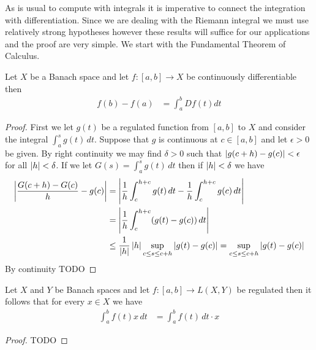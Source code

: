 As is usual to compute with integrals it is imperative to connect the
integration with differentiation.  Since we are dealing with the
Riemann integral we must use relatively strong hypotheses however
these results will suffice for our applications and the proof are very
simple.  We start with the Fundamental Theorem of Calculus.

\begin{thm}\label{FundamentalTheoremOfCalculusForBanachSpaceRiemannIntegrals}Let
 $X$ be a Banach space and let $f : [a,b] \to X$ be continuously
 differentiable then 
\begin{align*}
f(b) - f(a) &= \int_a^b Df(t) dt
\end{align*}
\end{thm}
\begin{proof}
First we let $g(t)$ be a regulated function from $[a,b]$ to $X$ and
consider the integral $\int_a^s g(t) \, dt$.  Suppose that $g$ is
continuous at $c \in [a,b]$ and let $\epsilon > 0$ be given.  By
right continuity we may find $\delta > 0$ such that $\left \vert g(c+h) -
  g(c) \right \vert < \epsilon$ for all $\left \vert h \right \vert < \delta$.  If we let $G(s) = \int_a^s g(t) \,
dt$ then if $\left \vert h \right \vert < \delta$ we have
\begin{align*}
\left \vert  \frac{G(c + h) - G(c)}{h} - g(c) \right \vert &= \left \vert \frac{1}{h}
                                          \int_c^{h+c} g(t)\, dt  -
                                          \frac{1}{h} \int_c^{h+c}
                                          g(c) \, dt \right \vert \\
&= \left \vert \frac{1}{h}  \int_c^{h+c} (g(t) - g(c)) \, dt \right \vert \\
&\leq \frac{1}{\left \vert h \right \vert} \left \vert h \right \vert \sup_{c \leq s \leq c+h} \left \vert g(t) -
  g(c) \right \vert 
=\sup_{c \leq s \leq c+h} \left \vert g(t) -  g(c) \right \vert 
\end{align*}
By continuity
TODO
\end{proof}

\begin{prop}\label{RiemannIntegralOfContinuousMaps}Let $X$ and $Y$ be
  Banach spaces and let $f : [a,b] \to L(X,Y)$ be regulated then it
  follows that for every $x \in X$ we have
\begin{align*}
\int_a^b f(t) x \, dt &= \int_a^b f(t) \, dt \cdot x
\end{align*}
\end{prop}
\begin{proof}
TODO
\end{proof}

